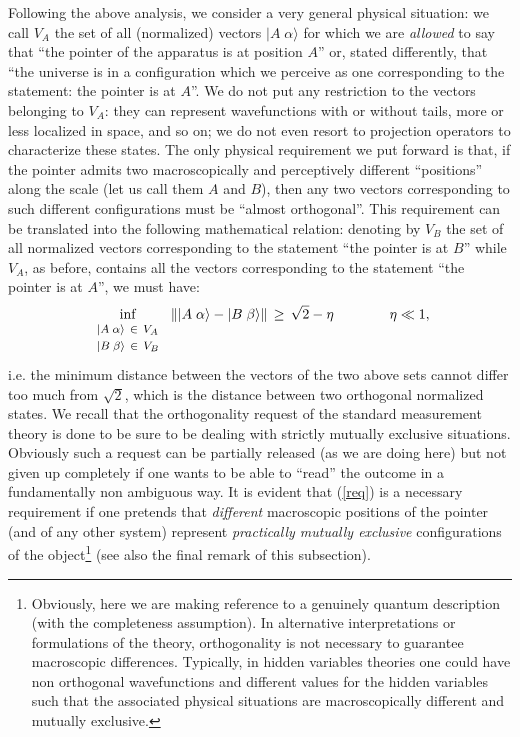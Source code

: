 \documentclass[12pt]{article}
\begin{document}
Following the above analysis, we consider a very general physical
situation: we call $V_{A}$ the set of all (normalized) vectors $
|A\; \alpha\rangle$ for which we are {\it allowed} to say that
``the pointer of the apparatus is at position $A$'' or, stated
differently, that ``the universe is in a configuration which we
perceive as one corresponding to the statement: the pointer is at
$A$''. We do not put any restriction to the vectors belonging to
$V_{A}$: they can represent wavefunctions with or without tails,
more or less localized in space, and so on; we do not even resort
to projection operators to characterize these states. The only
physical requirement we put forward is that, if the pointer admits
two macroscopically and perceptively different ``positions'' along
the scale (let us call them $A$ and $B$), then any two vectors
corresponding to such different configurations must be ``almost
orthogonal''. This requirement can be translated into the
following mathematical relation: denoting by $V_{B}$ the set of
all normalized vectors corresponding to the statement ``the
pointer is at $B$'' while $V_{A}$, as before, contains all the
vectors corresponding to the statement ``the pointer is at $A$'',
we must have:
\begin{equation} \label{req}
\inf_{\begin{array}{l}
\makebox{\footnotesize $|A\;\alpha\rangle \,\in\, V_{A}$} \\
\makebox{\footnotesize $|B\;\beta\rangle \,\in\, V_{B}$}
\end{array}}\, \| |A\;\alpha\rangle -
|B\;\beta\rangle \|\, \geq\, \sqrt{2} - \eta \qquad\qquad \eta \ll
1,
\end{equation}
i.e. the minimum distance between the vectors of the two above
sets cannot differ too much from $\sqrt{2}$, which is the distance
between two orthogonal normalized states. We recall that the
orthogonality request of the standard measurement theory is done
to be sure to be dealing with strictly mutually exclusive
situations. Obviously such a request can be partially released (as
we are doing here) but not given up completely if one wants to be
able to ``read'' the outcome in a fundamentally non ambiguous way.
It is evident that  (\ref{req}) is a necessary requirement if one
pretends that {\it different} macroscopic positions of the pointer
(and of any other system) represent {\it practically mutually exclusive}
configurations of the object\footnote{Obviously, here we are
making reference to a genuinely quantum description (with the
completeness assumption). In alternative interpretations or
formulations of the theory, orthogonality is not necessary  to
guarantee macroscopic differences. Typically, in hidden variables
theories one could have non orthogonal wavefunctions and different
values for the hidden variables such that the associated physical
situations are macroscopically different and mutually exclusive.}
(see also the final remark of this subsection).
\end{document}
